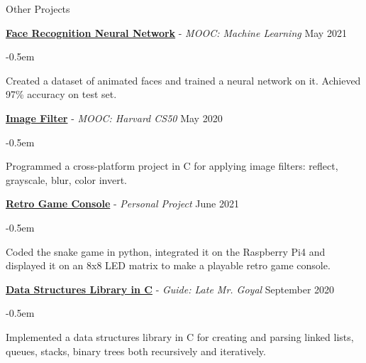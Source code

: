 \documentclass{resume} %
\begin{document}
\begin{rSection}{Other Projects}

{\textbf{\href{https://github.com/atharvaaalok/Anime_NeuralNetwork}{Face Recognition Neural Network}} - \emph{MOOC: Machine Learning}} \hfill {May 2021}
\begin{list}{\raisebox{0.3ex}{\tiny$\bullet$}}{\leftmargin=1em}
\itemsep -0.5em \vspace{-0.5em} %
\item Created a dataset of animated faces and trained a neural network on it. Achieved 97\% accuracy on test set.
\end{list}

{\textbf{\href{https://github.com/atharvaaalok/Filters_in_C}{Image Filter}} - \emph{MOOC: Harvard CS50}} \hfill {May 2020}
\begin{list}{\raisebox{0.3ex}{\tiny$\bullet$}}{\leftmargin=1em}
\itemsep -0.5em \vspace{-0.5em} %
\item Programmed a cross-platform project in C for applying image filters: reflect, grayscale, blur, color invert.
\end{list}

{\textbf{\href{https://github.com/atharvaaalok/LED_matrix_snake_RPi}{Retro Game Console}} - \emph{Personal Project}} \hfill {June 2021}
\begin{list}{\raisebox{0.3ex}{\tiny$\bullet$}}{\leftmargin=1em}
\itemsep -0.5em \vspace{-0.5em} %
\item Coded the snake game in python, integrated it on the Raspberry Pi4 and displayed it on an 8x8 LED matrix to make a playable retro game console.
\end{list}

{\textbf{\href{https://github.com/atharvaaalok/DS_Library_C}{Data Structures Library in C}} - \emph{Guide: Late Mr. Goyal}} \hfill {September 2020}
\begin{list}{\raisebox{0.3ex}{\tiny$\bullet$}}{\leftmargin=1em}
\itemsep -0.5em \vspace{-0.5em} %
\item Implemented a data structures library in C for creating and parsing linked lists, queues, stacks, binary trees both recursively and iteratively.
\end{list}

\end{rSection}
\end{document}
